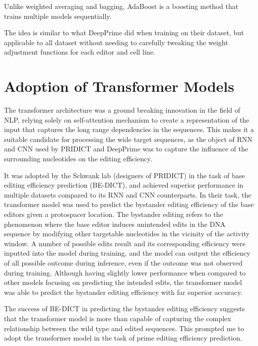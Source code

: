 Unlike weighted averaging and bagging, AdaBoost is a boosting method that trains multiple models sequentially.

The idea is similar to what DeepPrime did when training on their dataset, but applicable to all dataset without needing to carefully tweaking the weight adjustment functions for each editor and cell line.

\section{Adoption of Transformer Models}

The transformer architecture was a ground breaking innovation in the field of NLP, relying solely on self-attention mechanism to create a representation of the input that captures the long range dependencies in the sequences. This makes it a suitable candidate for processing the wide target sequences, as the object of RNN and CNN used by PRIDICT and DeepPrime was to capture the influence of the surrounding nucleotides on the editing efficiency.

It was adopted by the Schwank lab (designers of PRIDICT) in the task of base editing efficiency prediction (BE-DICT), and achieved superior performance in multiple datasets compared to its RNN and CNN counterparts\cite{marquartPredictingBaseEditing2021}. In their task, the transformer model was used to predict the bystander editing efficiency of the base editors given a protospacer location. The bystander editing refers to the phenomenon where the base editor induces unintended edits in the DNA sequence by modifying other targetable nucleotides in the vicinity of the activity window. A number of possible edits result and its corresponding efficiency were inputted into the model during training, and the model can output the efficiency of all possible outcome during inference, even if the outcome was not observed during training. Although having slightly lower performance when compared to other models focusing on predicting the intended edits, the transformer model was able to predict the bystander editing efficiency with far superior accuracy.

The success of BE-DICT in predicting the bystander editing efficiency suggests that the transformer model is more than capable of capturing the complex relationship between the wild type and edited sequences. This prompted me to adopt the transformer model in the task of prime editing efficiency prediction.



